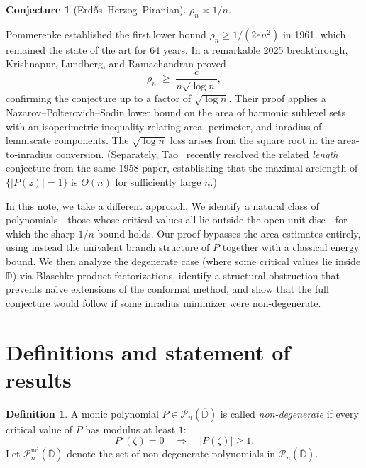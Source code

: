\documentclass[11pt,a4paper]{amsart}
\newtheorem{conjecture}[theorem]{Conjecture}
\theoremstyle{definition}
\newtheorem{definition}[theorem]{Definition}
\newcommand{\D}{\mathbb{D}}
\newcommand{\Pn}{\mathcal{P}_n}
\newcommand{\abs}[1]{\lvert #1 \rvert}
\begin{document}
\begin{conjecture}[Erd\H{o}s--Herzog--Piranian]
$\rho_n \asymp 1/n$.
\end{conjecture}

Pommerenke \cite{Pom61} established the first lower bound
$\rho_n \geq 1/(2en^2)$ in 1961, which remained the state of the art for
64 years.  In a remarkable 2025 breakthrough, Krishnapur, Lundberg, and
Ramachandran \cite{KLR25} proved
\begin{equation}\label{eq:KLR}
  \rho_n \;\geq\; \frac{c}{n\sqrt{\log n}},
\end{equation}
confirming the conjecture up to a factor of $\sqrt{\log n}$.
Their proof applies a Nazarov--Polterovich--Sodin lower bound on the area of
harmonic sublevel sets with an isoperimetric inequality relating area,
perimeter, and inradius of lemniscate components.  The $\sqrt{\log n}$ loss
arises from the square root in the area-to-inradius conversion.
(Separately, Tao~\cite{Tao25} recently resolved the related
\emph{length} conjecture from the same 1958 paper, establishing that the
maximal arclength of $\{\abs{P(z)} = 1\}$ is $\Theta(n)$ for
sufficiently large $n$.)

In this note, we take a different approach.  We identify a natural class of
polynomials---those whose critical values all lie outside the open unit
disc---for which the sharp $1/n$ bound holds.  Our proof bypasses the area
estimates entirely, using instead the univalent branch structure of $P$
together with a classical energy bound.  We then analyze the degenerate
case (where some critical values lie inside $\D$) via Blaschke product
factorizations, identify a structural obstruction that prevents na\"{\i}ve
extensions of the conformal method, and show that the full conjecture
would follow if some inradius minimizer were non-degenerate.

\section{Definitions and statement of results}

\begin{definition}
A monic polynomial $P \in \Pn(\overline{\D})$ is called \emph{non-degenerate}
if every critical value of $P$ has modulus at least $1$:
\[
  P'(\zeta) = 0 \quad\Longrightarrow\quad \abs{P(\zeta)} \geq 1.
\]
Let $\Pn^{\mathrm{nd}}(\overline{\D})$ denote the set of non-degenerate
polynomials in $\Pn(\overline{\D})$.
\end{definition}
\end{document}
